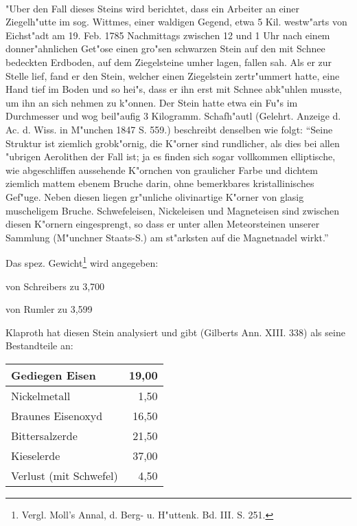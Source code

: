 \documentclass[a4paper, 11pt, oneside]{article}
\begin{document}
\paragraph{}
"Uber den Fall dieses Steins wird berichtet, dass ein Arbeiter an einer Ziegelh"utte im sog. Wittmes, einer waldigen Gegend, etwa 5 Kil. westw"arts von Eichst"adt am 19. Feb. 1785 Nachmittags zwischen 12 und 1 Uhr nach einem donner"ahnlichen Get"ose einen gro"sen schwarzen Stein auf den mit Schnee bedeckten Erdboden, auf dem Ziegelsteine umher lagen, fallen sah. Als er zur Stelle lief, fand er den Stein, welcher einen Ziegelstein zertr"ummert hatte, eine Hand tief im Boden und so hei"s, dass er ihn erst mit Schnee abk"uhlen musste, um ihn an sich nehmen zu k"onnen. Der Stein hatte etwa ein Fu"s im Durchmesser und wog beil"aufig 3 Kilogramm. Schafh"autl (Gelehrt. Anzeige d. Ac. d. Wiss. in M"unchen 1847 S. 559.) beschreibt denselben wie folgt: "`Seine Struktur ist ziemlich grobk"ornig, die K"orner sind rundlicher, als dies bei allen "ubrigen Aerolithen der Fall ist; ja es finden sich sogar vollkommen elliptische, wie abgeschliffen aussehende K"ornchen von graulicher Farbe und dichtem ziemlich mattem ebenem Bruche darin, ohne bemerkbares kristallinisches Gef"uge. Neben diesen liegen gr"unliche olivinartige K"orner von glasig muscheligem Bruche. Schwefeleisen, Nickeleisen und Magneteisen sind zwischen diesen K"ornern eingesprengt, so dass er unter allen Meteorsteinen unserer Sammlung (M"unchner Staats-S.) am st"arksten auf die Magnetnadel wirkt."'

Das spez. Gewicht\footnote{Vergl. Moll's Annal, d. Berg- u. H"uttenk. Bd. III. S. 251.} wird angegeben:

von Schreibers zu 3,700

von Rumler zu 3,599

Klaproth hat diesen Stein analysiert und gibt (Gilberts Ann. XIII. 338) als seine Bestandteile an:
\begin{center}
    \begin{tabular}{ |l|r| } 
    \hline
    Gediegen Eisen & 19,00\\\hline
    Nickelmetall & 1,50\\\hline
    Braunes Eisenoxyd & 16,50\\\hline
    Bittersalzerde & 21,50\\\hline
    Kieselerde & 37,00\\\hline
    Verlust (mit Schwefel) & 4,50\\
    \hline
    \end{tabular}
\end{center}
\end{document}
